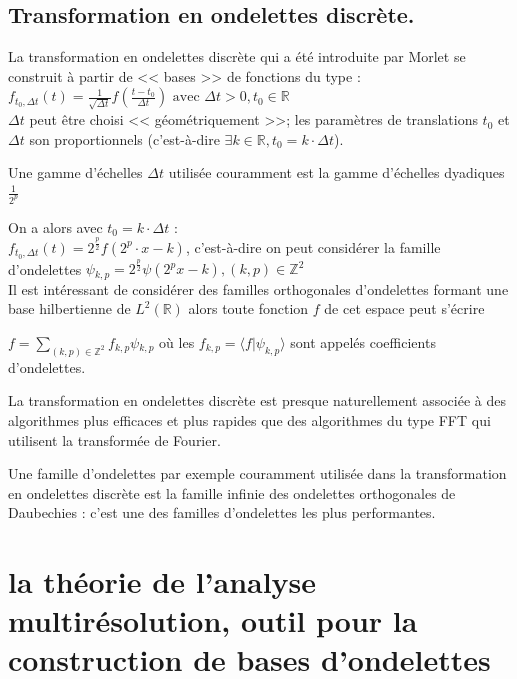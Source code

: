 \documentclass{article}
\begin{document}
\subsection{Transformation en ondelettes discrète.}

La transformation en ondelettes discrète qui a été introduite par Morlet se construit à partir de << bases >> de fonctions du type : \\

$\displaystyle f_{t_{0},\Delta{}t}(t) = \frac{1}{\sqrt{\Delta{}t}}f(\frac{t-t_0}{\Delta{}t}) \text{ avec } \Delta{}t > 0, t_0 \in \mathbb{R}$ \\

$\Delta{}t$ peut être choisi << géométriquement >>; les paramètres de translations $t_0$ et $\Delta{}t$ son proportionnels (c'est-à-dire $\exists k \in \mathbb{R}, t_0 = k\cdot{}\Delta{}t$).

Une gamme d'échelles $\Delta{}t$ utilisée couramment est la gamme d'échelles dyadiques $\frac{1}{2^p}$

On a alors avec $t_0 = k\cdot\Delta{}t$ : \\

$\displaystyle f_{t_{0},\Delta{}t}(t) = 2^{\frac{p}{2}}f(2^{p}\cdot{}x - k)$, c'est-à-dire on peut considérer la famille d'ondelettes $\psi{}_{k,p} = 2^{\frac{p}{2}}\psi{}(2^{p}x - k ), (k,p) \in \mathbb{Z}^2$ \\

Il est intéressant de considérer des familles orthogonales d'ondelettes formant une base hilbertienne de $L^2(\mathbb{R})$ alors toute fonction $f$ de cet espace peut s'écrire 

$\displaystyle f = \sum_{(k,p) \in \mathbb{Z}^2}f_{k,p}\psi{}_{k,p}$ où les $f_{k,p} = \langle{}f|\psi_{k,p}\rangle$ sont appelés coefficients d'ondelettes.

La transformation en ondelettes discrète est presque naturellement associée à des algorithmes plus efficaces et plus rapides que des algorithmes du type FFT qui utilisent la transformée de Fourier.

Une famille d’ondelettes par exemple couramment utilisée dans la transformation en ondelettes discrète est la famille infinie des ondelettes orthogonales de Daubechies : c’est une des familles d’ondelettes les plus performantes.


\section{la théorie de l'analyse multirésolution, outil pour la construction de bases d'ondelettes}
\end{document}
